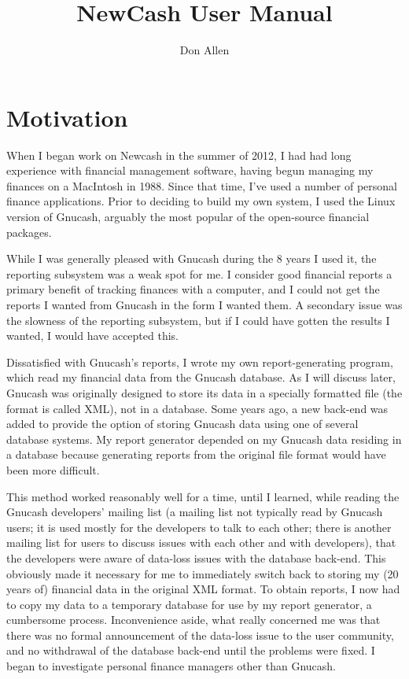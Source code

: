 \documentclass{report}
\begin{document}
\addtolength{\hoffset}{-1cm}
\title{NewCash User Manual}
\author{Don Allen}
\maketitle
\tableofcontents
\listoffigures


\newpage
\chapter{Motivation}
When I began work on Newcash in the summer of 2012, I had had long experience with financial management software, having begun  managing my finances on a MacIntosh in 1988. 
Since that time, I've used a number of personal finance applications. Prior to deciding to build my own system, I used the Linux version of Gnucash, arguably the most popular of the open-source financial packages.

While I was generally pleased with Gnucash during the 8 years I used it,  the reporting subsystem was a  weak spot for me. 
I consider good financial reports a primary benefit of tracking finances with a computer, and I could not get the reports I wanted from Gnucash in the form I wanted them. 
A secondary issue was the slowness of the reporting subsystem, but if I could have gotten the results I wanted, I would have accepted this.

Dissatisfied with Gnucash's reports, I wrote my own report-generating program,  which read my financial data from the Gnucash database. 
As I will discuss later, Gnucash was originally designed to store its data in a specially formatted file (the format is called XML), not in a database. 
Some years ago, a new back-end was added to provide the option of storing Gnucash data using one of several database systems. 
My report generator depended on my Gnucash data residing in a database because generating reports from the original file format would have been more difficult.

This method worked reasonably well for a time, until I learned, while reading the Gnucash developers' mailing list (a mailing list not typically read by Gnucash users; 
it is used mostly for the developers to talk to each other; there is another mailing list for users to discuss issues with each other and with developers), 
that the developers were aware of data-loss issues with the database back-end. This obviously made it necessary for me to immediately switch back to storing my (20 years of) financial data in the original XML format. 
To obtain reports, I now had to copy my data to a temporary database for use by my report generator, a cumbersome process. 
Inconvenience aside, what really concerned me was that there was no formal announcement of the data-loss issue to the user community, and no withdrawal of the database back-end until the problems were fixed.  
I began to investigate personal finance managers other than Gnucash.
\end{document}
